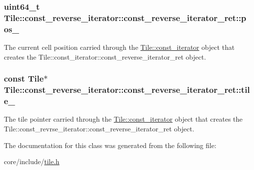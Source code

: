 \subsubsection[{pos\+\_\+}]{\setlength{\rightskip}{0pt plus 5cm}uint64\+\_\+t Tile\+::const\+\_\+reverse\+\_\+iterator\+::const\+\_\+reverse\+\_\+iterator\+\_\+ret\+::pos\+\_\+\hspace{0.3cm}{\ttfamily [private]}}\label{classTile_1_1const__reverse__iterator_1_1const__reverse__iterator__ret_a444e0e8a11cf929858375db645c8624c}
The current cell position carried through the \hyperlink{classTile_1_1const__iterator}{Tile\+::const\+\_\+iterator} object that creates the Tile\+::const\+\_\+iterator\+::const\+\_\+reverse\+\_\+iterator\+\_\+ret object. \hypertarget{classTile_1_1const__reverse__iterator_1_1const__reverse__iterator__ret_a4e0fd3c1cfb7ade67642633609e45f36}{}
\subsubsection[{tile\+\_\+}]{\setlength{\rightskip}{0pt plus 5cm}const {\bf Tile}$\ast$ Tile\+::const\+\_\+reverse\+\_\+iterator\+::const\+\_\+reverse\+\_\+iterator\+\_\+ret\+::tile\+\_\+\hspace{0.3cm}{\ttfamily [private]}}\label{classTile_1_1const__reverse__iterator_1_1const__reverse__iterator__ret_a4e0fd3c1cfb7ade67642633609e45f36}
The tile pointer carried through the \hyperlink{classTile_1_1const__iterator}{Tile\+::const\+\_\+iterator} object that creates the Tile\+::const\+\_\+revrse\+\_\+iterator\+::const\+\_\+reverse\+\_\+iterator\+\_\+ret object. 

The documentation for this class was generated from the following file\+:\begin{DoxyCompactItemize}
\item 
core/include/\hyperlink{tile_8h}{tile.\+h}\end{DoxyCompactItemize}
